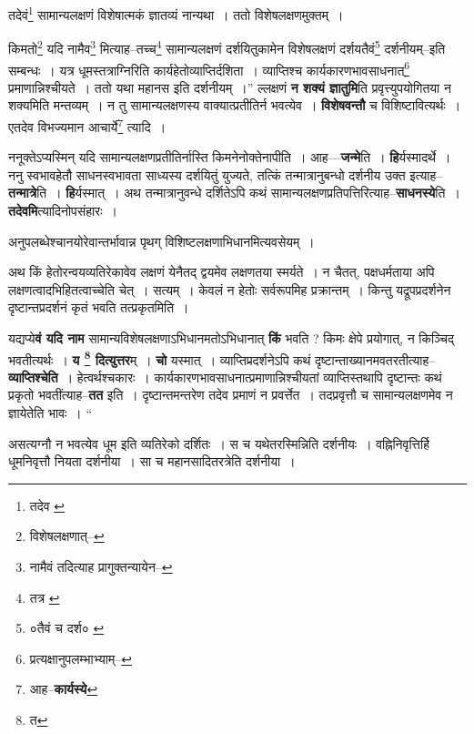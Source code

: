 \documentclass[article,12pt,a4paper]{memoir}
\begin{document}
	तदेवं\footnote{तदेव \cite{dp-edE}} सामान्यलक्षणं विशेषात्मकं ज्ञातव्यं नान्यथा । ततो विशेषलक्षणमुक्तम् । 
	  
	किमतो\footnote{विशेषलक्षणात्--\cite{dp-msD-n}} यदि नामैव\footnote{नामैवं तदित्याह \cite{dp-edE} प्रागुक्तन्यायेन--\cite{dp-msD-n}} मित्याह--तच्च\footnote{तत्र \cite{dp-msA} \cite{dp-msB} \cite{dp-edP} \cite{dp-edH} \cite{dp-edE}} सामान्यलक्षणं दर्शयितुकामेन विशेषलक्षणं दर्शयतैवं\footnote{०तैवं च दर्श० \cite{dp-msB}} दर्शनीयम्--इति सम्बन्धः । यत्र धूमस्तत्राग्निरिति कार्यहेतोव्याप्तिर्दशिता । व्याप्तिश्च कार्यकारणभावसाधनात्\footnote{प्रत्यक्षानुपलम्भाभ्याम्--\cite{dp-msD-n}} प्रमाणान्निश्चीयते । ततो यथा महानस इति दर्शनीयम् ।” ल्लक्षणं \textbf{न शक्यं ज्ञातुमि}ति प्रवृत्त्युपयोगितया न शक्यमिति मन्तव्यम् । न तु सामान्यलक्षणस्य वाक्यात्प्रतीतिर्न भवत्येव । \textbf{विशेषवन्तौ} च विशिष्टावित्यर्थः । एतदेव विभज्यमान आचार्ये\footnote{आह--\textbf{कार्यस्ये}} त्यादि ।
	\pend
      

	  \pstart ननूक्तेऽप्यस्मिन् यदि सामान्यलक्षणप्रतीतिर्नास्ति किमनेनोक्तेनापीति । आह—\textbf{जन्मे}ति । \textbf{हि}र्यस्मादर्थे । ननु स्वभावहेतौ साधनस्वभावता साध्यस्य दर्शयितुं युज्यते, तत्किं तन्मात्रानुबन्धो दर्शनीय उक्त इत्याह--\textbf{तन्मात्रे}ति । \textbf{हि}र्यस्मात् । अथ तन्मात्रानुवन्धे दर्शितेऽपि कथं सामान्यलक्षणप्रतिपत्तिरित्याह--\textbf{साधनस्ये}ति । \textbf{तदेवमि}त्यादिनोपसंहारः ।
	\pend
      

	  \pstart अनुपलब्धेश्चानयोरेवान्तर्भावान्न पृथग् विशिष्टलक्षणाभिधानमित्यवसेयम् ।
	\pend
      

	  \pstart अथ किं हेतोरन्वयव्यतिरेकावेव लक्षणं येनैतद् द्वयमेव लक्षणतया स्मर्यते । न चैतत्, पक्षधर्मताया अपि लक्षणत्वादभिहितत्वाच्चेति चेत् । सत्यम् । केवलं न हेतोः सर्वरूपमिह प्रक्रान्तम् । किन्तु यद्रूपप्रदर्शनेन दृष्टान्तप्रदर्शनं कृतं भवति तत्प्रकृतमिति ।
	\pend
      

	  \pstart यद्यप्ये\textbf{वं यदि नाम} सामान्यविशेषलक्षणाऽभिधानमतोऽभिधानात् \textbf{किं} भवति ? किमः क्षेपे प्रयोगात्, न किञ्चिद् भवतीत्यर्थः । \textbf{य \footnote{त} दित्युत्तर}म् । \textbf{चो} यस्मात् । व्याप्तिप्रदर्शनेऽपि कथं दृष्टान्ताख्यानमवतरतीत्याह--\textbf{व्याप्तिश्चेति} । हेत्वर्थश्चकारः । कार्यकारणभावसाधनात्प्रमाणान्निश्चीयतां व्याप्तिस्तथापि दृष्टान्तः कथं प्रकृतो भवतींत्याह--\textbf{तत} इति । दृष्टान्तमन्तरेण तदेव प्रमाणं न प्रवर्त्तेत । तदप्रवृत्तौ च सामान्यलक्षणमेव न ज्ञायेतेति भावः ।  \leavevmode{} “
	  
	असत्यग्नौ न भवत्येव धूम इति व्यतिरेको दर्शितः । स च यथेतरस्मिन्निति दर्शनीयः । वह्निनिवृत्तिर्हि धूमनिवृत्तौ नियता दर्शनीया । सा च महानसादितरत्रेति दर्शनीया । 
	  
\end{document}
